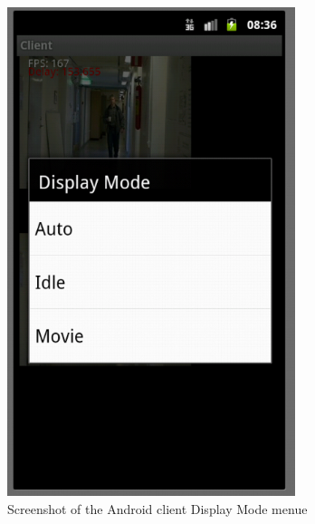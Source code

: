 \documentclass[8pt,titlepage]{article}
\begin{document}
\begin{figure}[hbp]
\includegraphics[width=0.75\textwidth]{../screenshots/androidDisplayMode.png}
\caption{Screenshot of the Android client Display Mode menue}
\end{figure}
\end{document}
